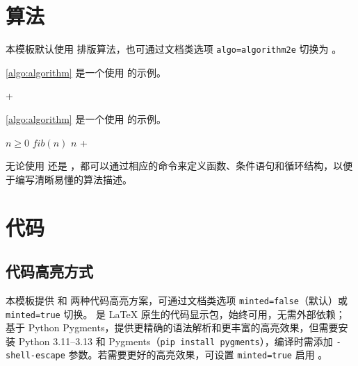 \section{算法}

本模板默认使用  排版算法，也可通过文档类选项 \texttt{algo=algorithm2e} 切换为 。

\iftjalgorithmtwoe
  \cref{algo:algorithm} 是一个使用  的示例。

  \begin{algorithm}[H]
    \caption{计算斐波那契数列}\label{algo:algorithm}
    \;
    \Return {} + \;
  \end{algorithm}
\else
  \cref{algo:algorithm} 是一个使用  的示例。

  \begin{algorithm}
    \caption{计算斐波那契数列}\label{algo:algorithm}
    \begin{algorithmic}[1]
      \Require $n \geq 0$
      \Ensure $fib(n)$
      \State \Return $n$
      \Else
      \State \Return {} + 
      \EndIf
      \EndFunction
    \end{algorithmic}
  \end{algorithm}
\fi

无论使用  还是 ，都可以通过相应的命令来定义函数、条件语句和循环结构，以便于编写清晰易懂的算法描述。

\section{代码}

\subsection{代码高亮方式}

本模板提供  和  两种代码高亮方案，可通过文档类选项 \texttt{minted=false}（默认）或 \texttt{minted=true} 切换。 是 \LaTeX{} 原生的代码显示包，始终可用，无需外部依赖； 基于 Python Pygments，提供更精确的语法解析和更丰富的高亮效果，但需要安装 Python 3.11–3.13 和 Pygments（\texttt{pip install pygments}），编译时需添加 \texttt{-shell-escape} 参数。若需要更好的高亮效果，可设置 \texttt{minted=true} 启用 。

